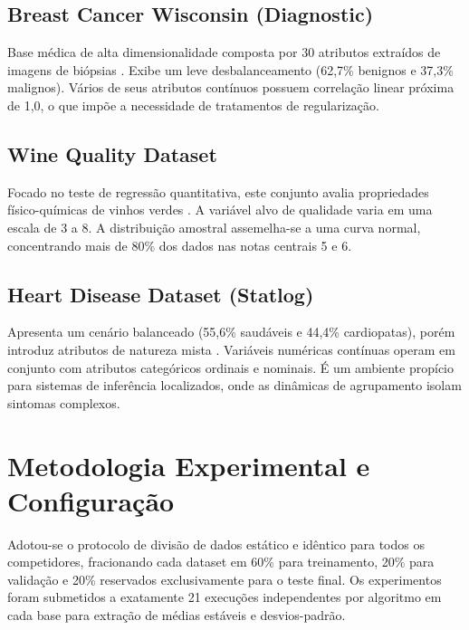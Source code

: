 \documentclass[10pt, journal, compsoc]{IEEEtran}
\begin{document}
\subsection{Breast Cancer Wisconsin (Diagnostic)}
Base médica de alta dimensionalidade composta por 30 atributos extraídos de imagens de biópsias \cite{breast_cancer_wisconsin_(diagnostic)_17}. Exibe um leve desbalanceamento (62,7\% benignos e 37,3\% malignos). Vários de seus atributos contínuos possuem correlação linear próxima de 1,0, o que impõe a necessidade de tratamentos de regularização.

\subsection{Wine Quality Dataset}
Focado no teste de regressão quantitativa, este conjunto avalia propriedades físico-químicas de vinhos verdes \cite{wine_quality_186}. A variável alvo de qualidade varia em uma escala de 3 a 8. A distribuição amostral assemelha-se a uma curva normal, concentrando mais de 80\% dos dados nas notas centrais 5 e 6.

\subsection{Heart Disease Dataset (Statlog)}
Apresenta um cenário balanceado (55,6\% saudáveis e 44,4\% cardiopatas), porém introduz atributos de natureza mista \cite{heart_disease_45}. Variáveis numéricas contínuas operam em conjunto com atributos categóricos ordinais e nominais. É um ambiente propício para sistemas de inferência localizados, onde as dinâmicas de agrupamento isolam sintomas complexos.

\section{Metodologia Experimental e Configuração}
Adotou-se o protocolo de divisão de dados estático e idêntico para todos os competidores, fracionando cada dataset em 60\% para treinamento, 20\% para validação e 20\% reservados exclusivamente para o teste final. Os experimentos foram submetidos a exatamente 21 execuções independentes por algoritmo em cada base para extração de médias estáveis e desvios-padrão.
\end{document}
